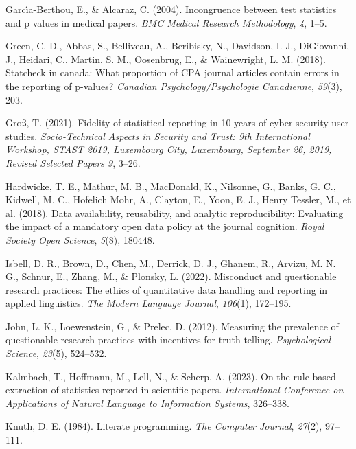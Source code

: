 \documentclass[
  doc,
  longtable,
  nolmodern,
  notxfonts,
  notimes,
  colorlinks=true,linkcolor=blue,citecolor=blue,urlcolor=blue]{apa7}
\newlength{\cslhangindent}
\newenvironment{CSLReferences}[2] %
 {\begin{list}{}{%
  \setlength{\itemindent}{0pt}
  \setlength{\leftmargin}{0pt}
  \setlength{\parsep}{0pt}
  \ifodd #1
   \setlength{\leftmargin}{\cslhangindent}
   \setlength{\itemindent}{-1\cslhangindent}
  \fi
  \setlength{\itemsep}{#2\baselineskip}}}
 {\end{list}}
\begin{document}
\begin{CSLReferences}{1}{0}
Garcı́a-Berthou, E., \& Alcaraz, C. (2004). Incongruence between test
statistics and p values in medical papers. \emph{BMC Medical Research
Methodology}, \emph{4}, 1--5.

Green, C. D., Abbas, S., Belliveau, A., Beribisky, N., Davidson, I. J.,
DiGiovanni, J., Heidari, C., Martin, S. M., Oosenbrug, E., \&
Wainewright, L. M. (2018). Statcheck in canada: What proportion of CPA
journal articles contain errors in the reporting of p-values?
\emph{Canadian Psychology/Psychologie Canadienne}, \emph{59}(3), 203.

Groß, T. (2021). Fidelity of statistical reporting in 10 years of cyber
security user studies. \emph{Socio-Technical Aspects in Security and
Trust: 9th International Workshop, STAST 2019, Luxembourg City,
Luxembourg, September 26, 2019, Revised Selected Papers 9}, 3--26.

Hardwicke, T. E., Mathur, M. B., MacDonald, K., Nilsonne, G., Banks, G.
C., Kidwell, M. C., Hofelich Mohr, A., Clayton, E., Yoon, E. J., Henry
Tessler, M., et al. (2018). Data availability, reusability, and analytic
reproducibility: Evaluating the impact of a mandatory open data policy
at the journal cognition. \emph{Royal Society Open Science},
\emph{5}(8), 180448.

Isbell, D. R., Brown, D., Chen, M., Derrick, D. J., Ghanem, R., Arvizu,
M. N. G., Schnur, E., Zhang, M., \& Plonsky, L. (2022). Misconduct and
questionable research practices: The ethics of quantitative data
handling and reporting in applied linguistics. \emph{The Modern Language
Journal}, \emph{106}(1), 172--195.

John, L. K., Loewenstein, G., \& Prelec, D. (2012). Measuring the
prevalence of questionable research practices with incentives for truth
telling. \emph{Psychological Science}, \emph{23}(5), 524--532.

Kalmbach, T., Hoffmann, M., Lell, N., \& Scherp, A. (2023). On the
rule-based extraction of statistics reported in scientific papers.
\emph{International Conference on Applications of Natural Language to
Information Systems}, 326--338.

Knuth, D. E. (1984). Literate programming. \emph{The Computer Journal},
\emph{27}(2), 97--111.


\end{CSLReferences}
\end{document}
